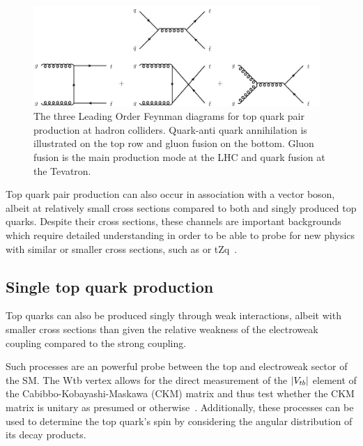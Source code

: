 \begin{figure}[htbp]
\begin{center}
\includegraphics[width=0.97\textwidth]{figs/top-physics/ttbar_feyn.jpg}
\caption{The three Leading Order Feynman diagrams for top quark pair production at hadron colliders. Quark-anti quark annihilation is illustrated on the top row and gluon fusion on the bottom. Gluon fusion is the main production mode at the LHC and quark fusion at the Tevatron.}
\label{fig:feyn_ttbar}
\end{center}
\end{figure}


Top quark pair production can also occur in association with a vector boson, albeit at relatively small cross sections compared to both \ttbar and singly produced top quarks.
Despite their cross sections, these channels are important backgrounds which require detailed understanding in order to be able to probe for new physics with similar or smaller cross sections, such as \ttH or tZq~\cite{Khachatryan:2014ewa}.

\subsection{Single top quark production}\label{subsec:singleTopTheory}
Top quarks can also be produced singly through weak interactions, albeit with smaller cross sections than \ttbar given the relative weakness of the electroweak coupling compared to the strong coupling.

Such processes are an powerful probe between the top and electroweak sector of the SM.
The Wtb vertex allows for the direct measurement of the $\lvert V_{tb} \rvert$ element of the Cabibbo-Kobayashi-Maskawa (CKM) matrix and thus test whether the CKM matrix is unitary as presumed or otherwise~\cite{Shibata:2008sy}.
Additionally, these processes can be used to determine the top quark's spin by considering the angular distribution of its decay products.


